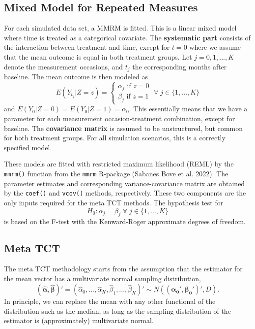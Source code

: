 \documentclass[
]{article}
\begin{document}
\hypertarget{mixed-model-for-repeated-measures}{%
\subsection{Mixed Model for Repeated Measures}\label{mixed-model-for-repeated-measures}}

For each simulated data set, a MMRM is fitted. This is a linear mixed model
where time is treated as a categorical covariate. The \textbf{systematic part} consists
of the interaction between treatment and time, except for \(t = 0\) where we
assume that the mean outcome is equal in both treatment groups. Let \(j = 0, 1, ..., K\)
denote the measurement occasions, and \(t_j\) the corresponding months after baseline.
The mean outcome is then modeled as
\[E(Y_{t_j} | Z = z) = \begin{cases}
 \alpha_j \text{ if } z = 0\\
 \beta_j \text{ if } z = 1
\end{cases}
\; \forall \; j \in \{ 1, ..., K \}\]
and \(E(Y_{0} | Z = 0) = E(Y_{0} | Z = 1) = \alpha_0\).
This essentially means that we have a parameter for each measurement
occasion-treatment combination, except for baseline. The \textbf{covariance matrix}
is assumed to be unstructured, but common for both treatment groups. For all
simulation scenarios, this is a correctly specified model.

These models are fitted with restricted maximum likelihood (REML) by the
\texttt{mmrm()} function from the \texttt{mmrm} R-package (Sabanes Bove et al. 2022). The parameter
estimates and corresponding variance-covariance matrix are obtained by the
\texttt{coef()} and \texttt{vcov()} methods, respectively. These two components are the only inputs required
for the meta TCT methods. The hypothesis test for
\[H_0: \alpha_j = \beta_j \; \forall \; j \in \{ 1, ..., K \} \]
is based on the F-test with the Kenward-Roger approximate degrees of freedom.

\hypertarget{meta-tct}{%
\subsection{Meta TCT}\label{meta-tct}}

The meta TCT methodology starts from the assumption that the estimator for the
mean vector has a multivariate normal sampling distribution,
\[(\hat{\boldsymbol{\alpha}}, \hat{\boldsymbol{\beta}})' = (\hat{\alpha}_{0}, ..., \hat{\alpha}_{K}, \hat{\beta}_{1}, ..., \hat{\beta}_{K})' \sim N((\boldsymbol{\alpha_0}', \boldsymbol{\beta_0}')', D).\]
In principle, we can replace the mean with any other functional of the
distribution such as the median, as long as the sampling distribution of the
estimator is (approximately) multivariate normal.
\end{document}
